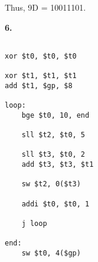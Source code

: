 \documentclass{article}
\newcommand{\lskip}{\newpage}
\begin{document}
Thus, 9D = 10011101.

\lskip

\textbf{6.}

\begin{lstlisting}

xor $t0, $t0, $t0

xor $t1, $t1, $t1
add $t1, $gp, $8

loop:
    bge $t0, 10, end

    sll $t2, $t0, 5

    sll $t3, $t0, 2
    add $t3, $t3, $t1

    sw $t2, 0($t3)

    addi $t0, $t0, 1

    j loop

end:
    sw $t0, 4($gp)

\end{lstlisting}
\end{document}
